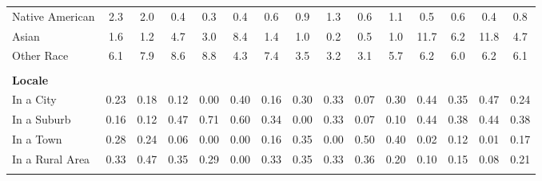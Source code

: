 \begin{tabular*}{\linewidth}{@{\extracolsep{\fill} } lcccccccccccccc}
\hspace{0.2cm}Native American&2.3&2.0&0.4&0.3&0.4&0.6&0.9&1.3&0.6&1.1&0.5&0.6&0.4&0.8\\%
\hspace{0.2cm}Asian&1.6&1.2&4.7&3.0&8.4&1.4&1.0&0.2&0.5&1.0&11.7&6.2&11.8&4.7\\%
\hspace{0.2cm}Other Race&6.1&7.9&8.6&8.8&4.3&7.4&3.5&3.2&3.1&5.7&6.2&6.0&6.2&6.1\\%
&&&&&&&&&&&&&&\\%
\multicolumn{15}{l}{\bfseries Locale}\\%
\hspace{0.2cm}In a City&0.23&0.18&0.12&0.00&0.40&0.16&0.30&0.33&0.07&0.30&0.44&0.35&0.47&0.24\\%
\hspace{0.2cm}In a Suburb&0.16&0.12&0.47&0.71&0.60&0.34&0.00&0.33&0.07&0.10&0.44&0.38&0.44&0.38\\%
\hspace{0.2cm}In a Town&0.28&0.24&0.06&0.00&0.00&0.16&0.35&0.00&0.50&0.40&0.02&0.12&0.01&0.17\\%
\hspace{0.2cm}In a Rural Area&0.33&0.47&0.35&0.29&0.00&0.33&0.35&0.33&0.36&0.20&0.10&0.15&0.08&0.21\\%
&&&&&&&&&&&&&&\\%
\hline%
\end{tabular*}